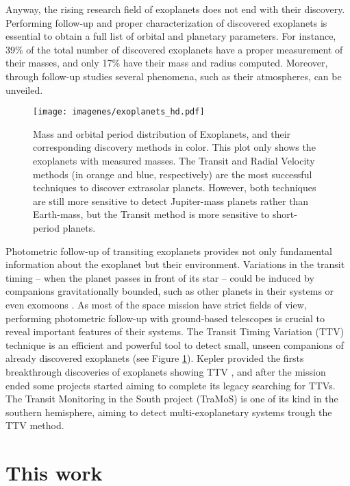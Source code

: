 Anyway, the rising research field of exoplanets does not end with their discovery. Performing follow-up and proper characterization of discovered exoplanets is essential to obtain a full list of orbital and planetary parameters. For instance,  39\%  of the total number of discovered exoplanets have a proper measurement of their masses, and only 17\% have their mass and radius computed. Moreover, through follow-up studies several phenomena, such as their atmospheres, can be unveiled. 

\begin{figure}[t]
\centering
\texttt{[image: imagenes/exoplanets\_hd.pdf]}
\caption{Mass and orbital period distribution of Exoplanets, and their corresponding discovery methods in color. This plot only shows the exoplanets with measured masses. The Transit and Radial Velocity methods (in orange and blue, respectively) are the most successful techniques to discover extrasolar planets. However, both techniques are still more sensitive to detect Jupiter-mass planets rather than Earth-mass, but the Transit method is more sensitive to short-period planets.}
\label{exoplanets}
\end{figure}

Photometric follow-up of transiting exoplanets provides not only fundamental information about the exoplanet but their environment. Variations in the transit timing -- when the planet passes in front of its star -- could be induced by companions gravitationally bounded, such as other planets in their systems or even exomoons \citep{Kipping2009a,Kipping2009b}. As most of the space mission have strict fields of view, performing photometric follow-up with ground-based telescopes is crucial to reveal important features of their systems. The Transit Timing Variation (TTV) technique \citep{Holman2005,Agol2005} is an efficient and powerful tool to detect small, unseen companions of already discovered exoplanets (see Figure \ref{exoplanets}). Kepler provided the firsts breakthrough discoveries of exoplanets showing TTV \citep{Holman2010}, and after the mission ended some projects started aiming to complete its legacy searching for TTVs. The Transit Monitoring in the South project (TraMoS) is one of its kind in the southern hemisphere, aiming to detect multi-exoplanetary systems trough the TTV method.  


\section{This work}

